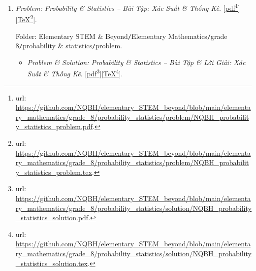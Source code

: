 \documentclass[12pt,twoside]{book}
\begin{document}
\begin{enumerate}
	Folder: {\sf Elementary STEM \& Beyond{\tt/}Elementary Mathematics{\tt/}grade 8{\tt/}triangle quadrilateral{\tt/}problem}.
	\begin{itemize}
		\item {\it Problem \& Solution: Triangles \& Quadrilaterals -- Bài Tập \& Lời Giải: Tam Giác \& Tứ Giác}. [\href{https://github.com/NQBH/elementary_STEM_beyond/blob/main/elementary_mathematics/grade_8/triangle_quadrilateral/solution/NQBH_triangle_quadrilateral_solution.pdf}{pdf}\footnote{{\sc url}: \url{https://github.com/NQBH/elementary_STEM_beyond/blob/main/elementary_mathematics/grade_8/triangle_quadrilateral/solution/NQBH_triangle_quadrilateral_solution.pdf}.}][\href{https://github.com/NQBH/elementary_STEM_beyond/blob/main/elementary_mathematics/grade_8/triangle_quadrilateral/solution/NQBH_triangle_quadrilateral_solution.tex}{\TeX}\footnote{{\sc url}: \url{https://github.com/NQBH/elementary_STEM_beyond/blob/main/elementary_mathematics/grade_8/triangle_quadrilateral/solution/NQBH_triangle_quadrilateral_solution.tex}.}].
		
		Folder: {\sf Elementary STEM \& Beyond{\tt/}Elementary Mathematics{\tt/}grade 8{\tt/}triangle quadrilateral{\tt/}solution}.
	\end{itemize}
	\item {\it Problem: Probability \& Statistics -- Bài Tập: Xác Suất \& Thống Kê}. [\href{https://github.com/NQBH/elementary_STEM_beyond/blob/main/elementary_mathematics/grade_8/probability_statistics/problem/NQBH_probability_statistics_problem.pdf}{pdf}\footnote{{\sc url}: \url{https://github.com/NQBH/elementary_STEM_beyond/blob/main/elementary_mathematics/grade_8/probability_statistics/problem/NQBH_probability_statistics_problem.pdf}.}][\href{https://github.com/NQBH/elementary_STEM_beyond/blob/main/elementary_mathematics/grade_8/probability_statistics/problem/NQBH_probability_statistics_problem.tex}{\TeX}\footnote{{\sc url}: \url{https://github.com/NQBH/elementary_STEM_beyond/blob/main/elementary_mathematics/grade_8/probability_statistics/problem/NQBH_probability_statistics_problem.tex}.}].
	
	Folder: {\sf Elementary STEM \& Beyond{\tt/}Elementary Mathematics{\tt/}grade 8{\tt/}probability \& statistics{\tt/}problem}.
	\begin{itemize}
		\item {\it Problem \& Solution: Probability \& Statistics -- Bài Tập \& Lời Giải: Xác Suất \& Thống Kê}. [\href{https://github.com/NQBH/elementary_STEM_beyond/blob/main/elementary_mathematics/grade_8/probability_statistics/solution/NQBH_probability_statistics_solution.pdf}{pdf}\footnote{{\sc url}: \url{https://github.com/NQBH/elementary_STEM_beyond/blob/main/elementary_mathematics/grade_8/probability_statistics/solution/NQBH_probability_statistics_solution.pdf}.}][\href{https://github.com/NQBH/elementary_STEM_beyond/blob/main/elementary_mathematics/grade_8/probability_statistics/solution/NQBH_probability_statistics_solution.tex}{\TeX}\footnote{{\sc url}: \url{https://github.com/NQBH/elementary_STEM_beyond/blob/main/elementary_mathematics/grade_8/probability_statistics/solution/NQBH_probability_statistics_solution.tex}.}].
		

\end{itemize}
\end{enumerate}
\end{document}
